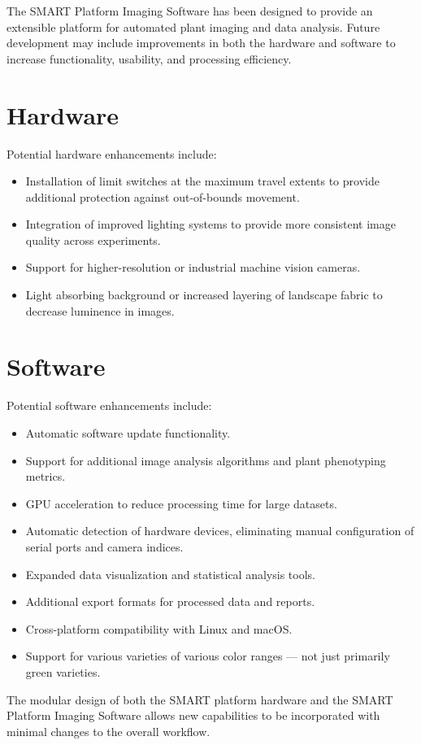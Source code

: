 \documentclass[12pt,a4paper,oneside]{report}
\begin{document}
The SMART Platform Imaging Software has been designed to provide an extensible platform for automated plant imaging and data analysis. Future development may include improvements in both the hardware and software to increase functionality, usability, and processing efficiency.

\section{Hardware}

Potential hardware enhancements include:

\begin{itemize}
    \item Installation of limit switches at the maximum travel extents to provide additional protection against out-of-bounds movement.
    \item Integration of improved lighting systems to provide more consistent image quality across experiments.
    \item Support for higher-resolution or industrial machine vision cameras.
    \item Light absorbing background or increased layering of landscape fabric to decrease luminence in images.
\end{itemize}

\section{Software}

Potential software enhancements include:

\begin{itemize}
    \item Automatic software update functionality.
    \item Support for additional image analysis algorithms and plant phenotyping metrics.
    \item GPU acceleration to reduce processing time for large datasets.
    \item Automatic detection of hardware devices, eliminating manual configuration of serial ports and camera indices.
    \item Expanded data visualization and statistical analysis tools.
    \item Additional export formats for processed data and reports.
    \item Cross-platform compatibility with Linux and macOS.
    \item Support for various varieties of various color ranges --- not just primarily green varieties.
\end{itemize}

The modular design of both the SMART platform hardware and the SMART Platform Imaging Software allows new capabilities to be incorporated with minimal changes to the overall workflow.
\end{document}
